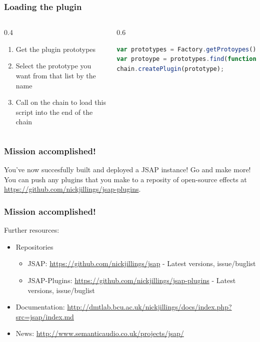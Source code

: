 \documentclass{beamer}
\begin{document}
\begin{frame}[fragile]
\frametitle{Loading the plugin}
\begin{columns}
\begin{column}{0.4\textwidth}
\begin{enumerate}
\item Get the plugin prototypes
\item Select the prototype you want from that list by the name
\item Call on the chain to load this script into the end of the chain
\end{enumerate}
\end{column}
\begin{column}{0.6\textwidth}
\begin{lstlisting}[language=javascript]
var prototypes = Factory.getProtoypes()
var protoype = prototypes.find(function(a){return a.name == "HelloWorld";});
chain.createPlugin(prototype);
\end{lstlisting}

\end{column}
\end{columns}

\end{frame}

\begin{frame}
\frametitle{Mission accomplished!}
You've now succesfully built and deployed a JSAP instance! Go and make more!\\
You can push any plugins that you make to a reposity of open-source effects at \url{https://github.com/nickjillings/jsap-plugins}.\\
\end{frame}

\begin{frame}
\frametitle{Mission accomplished!}
Further resources:
\begin{itemize}
\item Repositories
\begin{itemize}
\item JSAP: \url{https://github.com/nickjillings/jsap} - Latest versions, issue/buglist
\item JSAP-Plugins: \url{https://github.com/nickjillings/jsap-plugins} - Latest versions, issue/buglist
\end{itemize}
\item Documentation: \url{http://dmtlab.bcu.ac.uk/nickjillings/docs/index.php?src=jsap/index.md}
\item News: \url{http://www.semanticaudio.co.uk/projects/jsap/}
\end{itemize}
\end{frame}
\end{document}
